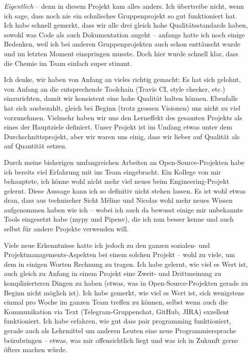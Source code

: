 \documentclass[a4paper]{article}
\begin{document}
\emph{Eigentlich} -- denn in diesem Projekt kam alles anders. Ich übertreibe
nicht, wenn ich sage, dass noch nie ein schulisches Gruppenprojekt so gut
funktioniert hat. Ich habe schnell gemerkt, dass wir alle drei gleich hohe
Qualitätsstandards haben, sowohl was Code als auch Dokumentation angeht --
anfangs hatte ich noch einige Bedenken, weil ich bei anderen Gruppenprojekten
auch schon enttäuscht wurde und im letzten Moment einspringen musste. Doch hier
wurde schnell klar, dass die Chemie im Team einfach super stimmt.

Ich denke, wir haben von Anfang an vieles richtig gemacht: Es hat sich
gelohnt, von Anfang an die entsprechende Toolchain (Travis CI, style checker,
etc.) einzurichten, damit wir konsistent eine hohe Qualität halten können.
Ebenfalls hat sich ausbezahlt, gleich bei Beginn (trotz grossen Visionen) uns
nicht zu viel vorzunehmen. Vielmehr haben wir uns den Lerneffekt des gesamten
Projekts als eines der Hauptziele definiert. Unser Projekt ist im Umfang etwas
unter dem Durchschnittsprojekt, aber wir waren uns einig, dass wir lieber auf
Qualität als auf Quantität setzen.

Durch meine bisherigen umfangreichen Arbeiten an Open-Source-Projekten habe ich
bereits viel Erfahrung mit ins Team eingebracht. Ein Kollege von mir behauptete,
ich könne wohl nicht mehr viel neues beim Engineering-Projekt gelernt. Diese
Aussage kann ich so definitiv nicht stehen lassen. Es ist wohl etwas dran, dass
aus technischer Sicht Méline und Nicolas wohl mehr neues Wissen aufgenommen
haben wie ich -- wobei ich auch da bewusst einige mir unbekannte Tools
eingesetzt habe (mypy und Pipenv), die ich nun besser kenne und auch selbst für
andere Projekte verwenden will.

Viele neue Erkenntnisse hatte ich jedoch zu den ganzen sozialen- und
Projektmanagements-Aspekten bei einem solchen Projekt -- wohl zu viele, um dem
in einigen Worten Rechnung zu tragen. Ich habe gelernt, wie viel es Wert ist,
auch gleich zu Anfang in einem Projekt eine Zweit- und Drittmeinung zu
komplizierteren Dingen zu haben (etwas, was in Open-Source-Projekten gerade zu
Beginn nicht möglich ist). Ich habe gemerkt, wie viel es Wert ist, sich
wenigstens einmal pro Woche im ganzen Team treffen zu können, selbst wenn auch
die Kommunikation via Text (Telegram-Gruppenchat, GitHub, JIRA) exzellent
funktioniert. Ich habe erfahren, wie gut dass pair programming funktioniert,
gerade auch als Lehrmittel um anderen Leuten eine neue Programmiersprache
beizubringen -- etwas, was mir offensichtlich liegt und was ich in Zukunft gerne
öfters machen würde.
\end{document}
